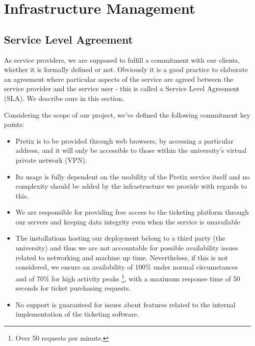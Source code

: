 \documentclass[12pt]{article}
\begin{document}
\newpage
\section{Infrastructure Management} \label{management} %

\subsection{Service Level Agreement} \label{management.sla} %


As service providers, we are supposed to fulfill a commitment with our clients, whether it is formally defined or not.
Obviously it is a good practice to elaborate an agreement where particular aspects of the service are agreed between the service provider and the service user -
this is called a Service Level Agreement (SLA).
We describe ours in this section. 

Considering the scope of our project, we've defined the following commitment key points:
\vspace{-10pt}
\begin{itemize}[noitemsep]
  \item Pretix is to be provided through web browsers, by accessing a particular address, and it will only be accessible to those within the university's virtual private network (VPN).
  \item Its usage is fully dependent on the usability of the Pretix service itself and no complexity should be added by the infrastructure we provide with regards to this.
  \item We are responsible for providing free access to the ticketing platform through our servers and keeping data integrity even when the service is unavailable
  \item The installations hosting our deployment belong to a third party (the university) and thus we are not accountable for possible availability issues related to networking and machine up time.
        Nevertheless, if this is not considered, we ensure an availability of 100\% under normal circumstances and of 70\% for high activity peaks \footnote{Over 50 requests per minute.}, with a maximum response time of 50 seconds for ticket purchasing requests. 
  \item No support is guaranteed for issues about features related to the internal implementation of the ticketing software.
\end{itemize}
\vspace{-10pt}
\end{document}
